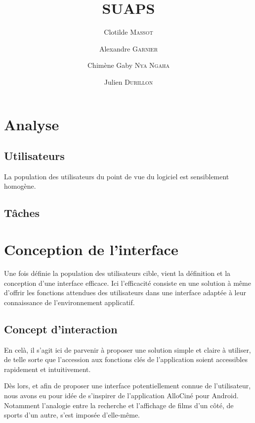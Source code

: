 \documentclass{article}
\title{SUAPS}
\author{Clotilde \textsc{Massot} \and Alexandre \textsc{Garnier} \and Chimène Gaby \textsc{Nya Ngaha} \and Julien \textsc{Durillon}}
\begin{document}
\maketitle

\section{Analyse}

	\subsection{Utilisateurs}
		La population des utilisateurs du point de vue du logiciel est sensiblement homogène.
	
	\subsection{Tâches}
	
\section{Conception de l'interface}

	Une fois définie la population des utilisateurs cible, vient la définition et la conception d'une interface efficace. Ici l'efficacité consiste en une solution à même d'offrir les fonctions attendues des utilisateurs dans une interface adaptée à leur connaissance de l'environnement applicatif.

	\subsection{Concept d'interaction}
	
	En celà, il s'agit ici de parvenir à proposer une solution simple et claire à utiliser, de telle sorte que l'accession aux fonctions clés de l'application soient accessibles rapidement et intuitivement.
	
	Dès lors, et afin de proposer une interface potentiellement connue de l'utilisateur, nous avons eu pour idée de s'inspirer de l'application AlloCiné pour Android. Notamment l'analogie entre la recherche et l'affichage de films d'un côté, de sports d'un autre, s'est imposée d'elle-même.
	
\end{document}
